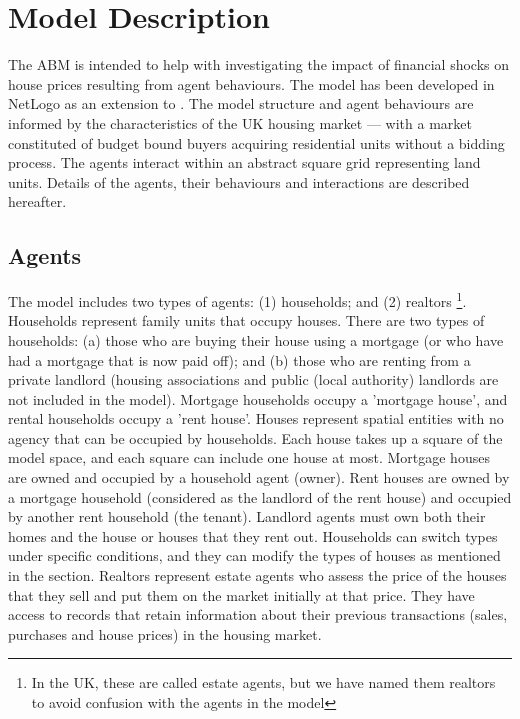 \section{Model Description} \label{Model Description}
The ABM is intended to help with investigating the impact of financial shocks on house prices resulting from agent behaviours. The model has been developed in NetLogo \citep{Wilensky1999} as an extension to \citet{Gilbert2009}. The model structure and agent behaviours are informed by the characteristics of the UK housing market --- with a market constituted of budget bound buyers acquiring residential units without a bidding process. The agents interact within an abstract square grid representing land units. Details of the agents, their behaviours and interactions are described hereafter.

\subsection{Agents}
The model includes two types of agents: (1) households; and (2) realtors \footnote{In the UK, these are called estate agents, but we have named them realtors to avoid confusion with the agents in the model}. Households represent family units that occupy houses. There are two types of households: (a) those who are buying their house using a mortgage (or who have had a mortgage that is now paid off); and (b) those who are renting from a private landlord (housing associations and  public (local authority) landlords are not included in the model). Mortgage households occupy a 'mortgage house', and rental households occupy a 'rent house'. Houses represent spatial entities with no agency that can be occupied by households. Each house takes up a square of the model space, and each square can include one house at most. Mortgage houses are owned and occupied by a household agent (owner). Rent houses are owned by a mortgage household (considered as the landlord of the rent house) and occupied by another rent household (the tenant). Landlord agents must own both their homes and the house or houses that they rent out. Households can switch types under specific conditions, and they can modify the types of houses as mentioned in the  section. Realtors represent estate agents who assess the price of the houses that they sell and put them on the market initially at that price. They have access to records that retain information about their previous transactions (sales, purchases and house prices) in the housing market.

